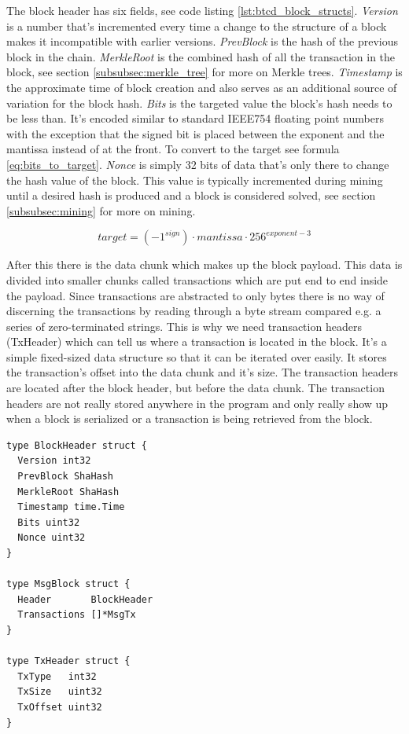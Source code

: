 \documentclass[12pt]{article}
\begin{document}
The block header has six fields, see code listing \ref{lst:btcd_block_structs}. \emph{Version} is a number that's incremented every time a change to the structure of a block makes it incompatible with earlier versions. \emph{PrevBlock} is the hash of the previous block in the chain. \emph{MerkleRoot} is the combined hash of all the transaction in the block, see section \ref{subsubsec:merkle_tree} for more on Merkle trees. \emph{Timestamp} is the approximate time of block creation and also serves as an additional source of variation for the block hash. \emph{Bits} is the targeted value the block's hash needs to be less than. It's encoded similar to standard IEEE754 floating point numbers with the exception that the signed bit is placed between the exponent and the mantissa instead of at the front. To convert to the target see formula \ref{eq:bits_to_target}. \emph{Nonce} is simply 32 bits of data that's only there to change the hash value of the block. This value is typically incremented during mining until a desired hash is produced and a block is considered solved, see section \ref{subsubsec:mining} for more on mining.

\begin{equation}\label{eq:bits_to_target}
\mathit{target} = (-1^{\mathit{sign}}) \cdot \mathit{mantissa} \cdot 256^{\mathit{exponent-3}}
\end{equation}

After this there is the data chunk which makes up the block payload. This data is divided into smaller chunks called transactions which are put end to end inside the payload. Since transactions are abstracted to only bytes there is no way of discerning the transactions by reading through a byte stream compared e.g. a series of zero-terminated strings. This is why we need transaction headers (TxHeader) which can tell us where a transaction is located in the block. It's a simple fixed-sized data structure so that it can be iterated over easily. It stores the transaction's offset into the data chunk and it's size. The transaction headers are located after the block header, but before the data chunk. The transaction headers are not really stored anywhere in the program and only really show up when a block is serialized or a transaction is being retrieved from the block.

\begin{lstlisting}[float=!ht,caption={Btcd Block Structure},label=lst:btcd_block_structs]
type BlockHeader struct {
  Version int32
  PrevBlock ShaHash
  MerkleRoot ShaHash
  Timestamp time.Time
  Bits uint32
  Nonce uint32
}

type MsgBlock struct {
  Header       BlockHeader
  Transactions []*MsgTx
}

type TxHeader struct {
  TxType   int32
  TxSize   uint32
  TxOffset uint32
}
\end{lstlisting}
\end{document}
